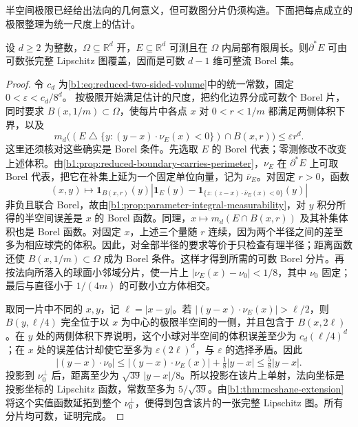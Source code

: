 半空间极限已经给出法向的几何意义，但可数图分片仍须构造。下面把每点成立的极限整理为统一尺度上的估计。

\begin{proposition}\label{b1:prop:reduced-boundary-rectifiable}
设 \(d\ge2\) 为整数，\(\Omega\subseteq\mathbb R^d\) 开，\(E\subseteq\mathbb R^d\) 可测且在 \(\Omega\) 内局部有限周长。则\(\partial^*E\) 可由可数张完整 Lipschitz 图覆盖，因而是可数 \(d-1\) 维可整流 Borel 集。
\end{proposition}
\begin{proof}
令 \(c_d\) 为\eqref{b1:eq:reduced-two-sided-volume}中的统一常数，固定
\(0<\varepsilon<c_d/8^d\)。
按极限开始满足估计的尺度，把约化边界分成可数个 Borel 片，同时要求 \(B(x,1/m)\subset\Omega\)，使每片中各点 \(x\) 对 \(0<r<1/m\) 都满足两侧体积下界，以及
\[
 m_d\bigl((E\mathbin{\triangle}\{y:(y-x)\cdot\nu_E(x)<0\})
                   \cap B(x,r)\bigr)\le\varepsilon r^d.
\]
这里还须核对这些确实是 Borel 条件。先选取 \(E\) 的 Borel 代表；零测修改不改变上述体积。由\cref{b1:prop:reduced-boundary-carries-perimeter}，\(\nu_E\) 在 \(\partial^*E\) 上可取 Borel 代表，把它在补集上延为一个固定单位向量，记为 \(\bar\nu_E\)。对固定 \(r>0\)，函数
\[
 (x,y)\longmapsto
 \mathbf1_{B(x,r)}(y)
 \left|
  \mathbf1_E(y)-
  \mathbf1_{\{z:(z-x)\cdot\bar\nu_E(x)<0\}}(y)
 \right|
\]
非负且联合 Borel，故由\cref{b1:prop:parameter-integral-measurability}，对 \(y\) 积分所得的半空间误差是 \(x\) 的 Borel 函数。同理，\(x\mapsto m_d(E\cap B(x,r))\) 及其补集体积也是 Borel 函数。对固定 \(x\)，上述三个量随 \(r\) 连续，因为两个半径之间的差至多为相应球壳的体积。因此，对全部半径的要求等价于只检查有理半径；距离函数还使 \(B(x,1/m)\subset\Omega\) 成为 Borel 条件。这样才得到所需的可数 Borel 分片。再按法向所落入的球面小邻域分片，使一片上
\(|\nu_E(x)-\nu_0|<1/8\)，其中 \(\nu_0\) 固定；最后与直径小于 \(1/(4m)\) 的可数小立方体相交。

取同一片中不同的 \(x,y\)，记 \(\ell=|x-y|\)。若
\(|(y-x)\cdot\nu_E(x)|>\ell/2\)，则 \(B(y,\ell/4)\) 完全位于以 \(x\) 为中心的极限半空间的一侧，并且包含于 \(B(x,2\ell)\)。在 \(y\) 处的两侧体积下界说明，这个小球对半空间的体积误差至少为 \(c_d(\ell/4)^d\)；在 \(x\) 处的误差估计却使它至多为 \(\varepsilon(2\ell)^d\)，与 \(\varepsilon\) 的选择矛盾。因此
\[
 |(y-x)\cdot\nu_0|
 \le |(y-x)\cdot\nu_E(x)|+\tfrac18|y-x|
 \le\tfrac58|y-x|.
\]
投影到 \(\nu_0^\perp\) 后，距离至少为 \(\sqrt{39}\,|y-x|/8\)。所以投影在该片上单射，法向坐标是投影坐标的 Lipschitz 函数，常数至多为 \(5/\sqrt{39}\)。由\cref{b1:thm:mcshane-extension}将这个实值函数延拓到整个 \(\nu_0^\perp\)，便得到包含该片的一张完整 Lipschitz 图。所有分片均可数，证明完成。
\end{proof}

